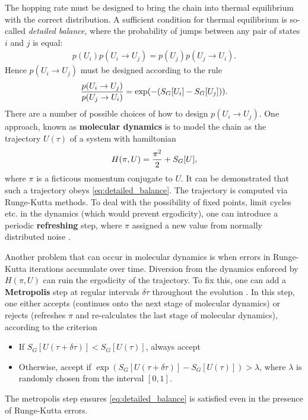 The hopping rate must be designed to bring the chain into thermal equilibrium with the correct distribution. A sufficient condition for thermal equilibrium is so-called {\it{detailed balance}}, where the probability of jumps between any pair of states $i$ and $j$ is equal:
\begin{align}
  p(U_i) p(U_i\to U_j) = p(U_j) p(U_j\to U_i).
\end{align}
Hence $p(U_i\to U_j)$ must be designed according to the rule
\begin{align}
  {p(U_i\to U_j) \over p(U_j\to U_i)} = \exp(-(S_G[U_i]-S_G[U_j])).
  \label{eq:detailed_balance}
\end{align}
There are a number of possible choices of how to design $p(U_i\to U_j)$. One approach, known as {\bf{molecular dynamics}} \cite{PhysRevLett.49.613,PhysRevD.28.1506} is to model the chain as the trajectory $U(\tau)$ of a system with hamiltonian
\begin{align}
  H(\pi,U) = {\pi^2\over 2} + S_G[U],
\end{align}
where $\pi$ is a ficticous momentum conjugate to $U$. It can be demonstrated that such a trajectory obeys \eqref{eq:detailed_balance}. The trajectory is computed via Runge-Kutta methods. To deal with the possibility of fixed points, limit cycles etc. in the dynamics (which would prevent ergodicity), one can introduce a periodic {\bf{refreshing}} step, where $\pi$ assigned a new value from normally distributed noise \cite{PhysRevLett.55.2774,duane1986}.

Another problem that can occur in molecular dynamics is when errors in Runge-Kutta iterations accumulate over time. Diversion from the dynamics enforced by $H(\pi,U)$ can ruin the ergodicity of the trajectory. To fix this, one can add a {\bf{Metropolis}} step at regular intervals $\delta\tau$ throughout the evolution \cite{doi:10.1063/1.1699114}. In this step, one either accepts (continues onto the next stage of molecular dynamics) or rejects (refreshes $\pi$ and re-calculates the last stage of molecular dynamics), according to the criterion
\begin{itemize}
\item
  If $S_G[U(\tau+\delta\tau)] < S_G[U(\tau)]$, always accept
\item
  Otherwise, accept if $\exp\left(S_G[U(\tau+\delta\tau)] - S_G[U(\tau)]\right) > \lambda$, where $\lambda$ is randomly chosen from the interval $[0,1]$.
\end{itemize}
The metropolis step ensures \eqref{eq:detailed_balance} is satisfied even in the presence of Runge-Kutta errors.

